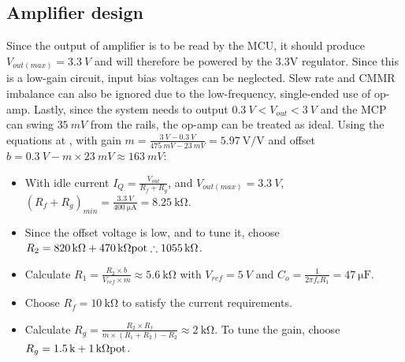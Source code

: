 \subsection{Amplifier design}

Since the output of amplifier is to be read by the MCU, it should produce $V_{out(max)} = \SI{3.3}{V}$
and will therefore be powered by the 3.3V regulator. Since this is a low-gain circuit, input bias voltages can be neglected.
Slew rate and CMMR imbalance can also be ignored due to the low-frequency, single-ended use of op-amp. Lastly, since the system
needs to output $\SI{0.3}{V} < V_{out} < \SI{3}{V}$ and the MCP can swing $\SI{35}{mV}$ from the rails, the op-amp can be treated as ideal.
Using the equations at \cite{gainOffset30Seconds},
with gain $m = \frac{\SI{3}{V} - \SI{0.3}{V}}{\SI{475}{mV} - \SI{23}{mV}} = \SI{5.97}{\volt\per\volt}$ and offset $b = \SI{0.3}{V} - m \times \SI{23}{mV} \approx \SI{163}{mV}$:

\begin{itemize}
  \item With idle current $I_Q = \frac{V_{out}}{R_f + R_g}$, and $V_{out(max)} = \SI{3.3}{V}$, $(R_f + R_g)_{min} = \frac{\SI{3.3}{V}}{\SI{400}{\micro\ampere}} = \SI{8.25}{\kilo\ohm}$.
  \item Since the offset voltage is low, and to tune it, choose $R_2 = \SI{820}{\kilo\ohm} + \SI{470}{\kilo\ohm} \textnormal{pot} \therefore \SI{1055}{\kilo\ohm}$.
  \item Calculate $R_1 = \frac{R_2 \times b}{V_{ref} \times m} \approx \SI{5.6}{\kilo\ohm}$ with $V_{ref} = \SI{5}{V}$ and $C_o = \frac{1}{2 \pi f_c R_1} = \SI{47}{\micro\farad}$.
  \item Choose $R_f = \SI{10}{\kilo\ohm}$ to satisfy the current requirements.
  \item Calculate $R_g = \frac{R_2 \times R_f}{m \times (R_1 + R_2) - R_2} \approx \SI{2}{\kilo\ohm}$. To tune the gain, choose $R_g = \SI{1.5}{k} + \SI{1}{\kilo\ohm}\textnormal{pot}$.
\end{itemize}